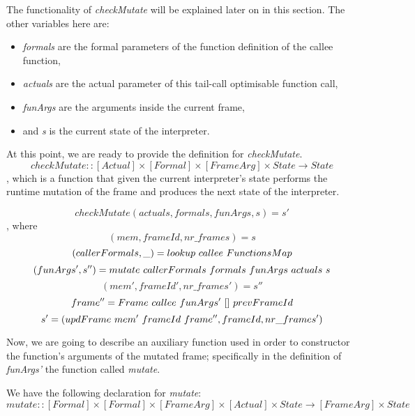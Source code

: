 \documentclass[diploma]{softlab-thesis}
\begin{document}
The functionality of \textit{checkMutate} will be explained later on in this section. The other variables 
here are:
\begin{itemize}
  \item \textit{formals} are the formal parameters of the function definition of the callee function,
  \item \textit{actuals} are the actual parameter of this tail-call optimisable function call,
  \item \textit{funArgs} are the arguments inside the current frame, 
  \item and \textit{s} is the current state of the interpreter.
\end{itemize}

At this point, we are ready to provide the definition for \textit{checkMutate}. 
\[checkMutate :: [Actual] \times [Formal] \times [FrameArg] \times State \rightarrow State \]
, which is a function that given the current interpreter's state performs the runtime mutation of the frame
and produces the next state of the interpreter. 

\[checkMutate (actuals, formals, funArgs, s) = s' \]
, where 
\[(mem, frameId, nr\_frames) = s \]
\[(callerFormals, \_) = lookup \hfill\ callee \hfill\ FunctionsMap \]
\[(funArgs', s'') = mutate \hfill\ callerFormals \hfill\ formals \hfill\ funArgs \hfill\ actuals \hfill\ s \]
\[(mem', frameId', nr\_frames') = s'' \]
\[frame'' = Frame \hfill\ callee \hfill\ funArgs' \hfill\ [] \hfill\ prevFrameId \]
\[s' = (updFrame \hfill\ mem' \hfill\ frameId \hfill\ frame'', frameId, nr\_frames') \]

Now, we are going to describe an auxiliary function used in order to constructor the function's arguments 
of the mutated frame; specifically in the definition of \textit{funArgs'} the function called \textit{mutate}.

We have the following declaration for \textit{mutate}:
\[mutate :: [Formal] \times [Formal] \times [FrameArg] \times [Actual] \times State \rightarrow [FrameArg] \times State \]
\end{document}
